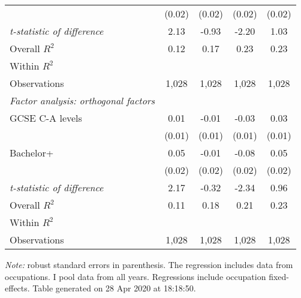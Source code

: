 \begin{center}
\begin{threeparttable}[!h]
\begin{tabular}{lcccc}
                    &      (0.02)         &      (0.02)         &      (0.02)         &      (0.02)         \\
\textit{t-statistic of difference}&        2.13         &       -0.93         &       -2.20         &        1.03         \\
\midrule Overall $ R^2$&        0.12         &        0.17         &        0.23         &        0.23         \\
Within $ R^2$       &                     &                     &                     &                     \\
Observations        &       1,028         &       1,028         &       1,028         &       1,028         \\
\midrule \vspace{1mm}\textit{Factor analysis: orthogonal factors} \\ 
\hspace{3mm}GCSE C-A levels&        0.01         &       -0.01         &       -0.03\sym{*}  &        0.03\sym{**} \\
                    &      (0.01)         &      (0.01)         &      (0.01)         &      (0.01)         \\
\hspace{3mm}Bachelor+&        0.05\sym{*}  &       -0.01         &       -0.08\sym{***}&        0.05\sym{*}  \\
                    &      (0.02)         &      (0.02)         &      (0.02)         &      (0.02)         \\
\textit{t-statistic of difference}&        2.17         &       -0.32         &       -2.34         &        0.96         \\
\midrule Overall $ R^2$&        0.11         &        0.18         &        0.21         &        0.23         \\
Within $ R^2$       &                     &                     &                     &                     \\
Observations        &       1,028         &       1,028         &       1,028         &       1,028         \\
\bottomrule
\bottomrule
\end{tabular}
\begin{tablenotes}
\item \footnotesize \textit{Note:} robust standard errors in parenthesis. The regression includes data from occupations. I pool data from all years. Regressions include occupation fixed-effects. Table generated on 28 Apr 2020 at 18:18:50.
\end{tablenotes}
\end{threeparttable}
\end{center}
